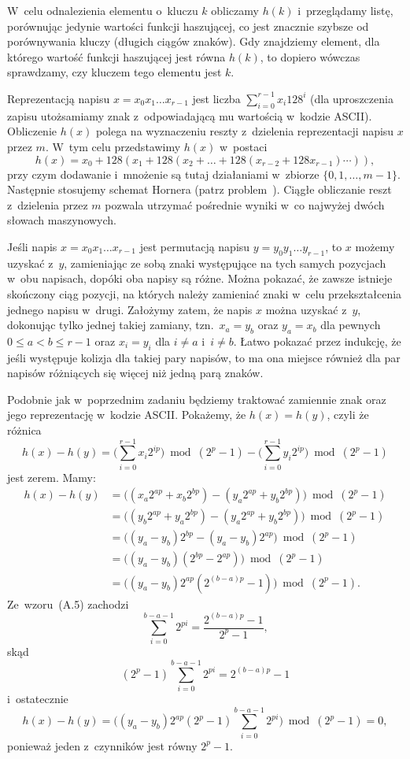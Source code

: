 
\exercise %
W~celu odnalezienia elementu o~kluczu $k$ obliczamy $h(k)$ i~przeglądamy listę, porównując jedynie wartości funkcji haszującej, co jest znacznie szybsze od porównywania kluczy (długich ciągów znaków).
Gdy znajdziemy element, dla którego wartość funkcji haszującej jest równa $h(k)$, to dopiero wówczas sprawdzamy, czy kluczem tego elementu jest $k$.

\exercise %
Reprezentacją napisu $x=x_0x_1\dots x_{r-1}$ jest liczba $\sum_{i=0}^{r-1}x_i128^i$ (dla uproszczenia zapisu utożsamiamy znak z~odpowiadającą mu wartością w~kodzie ASCII).
Obliczenie $h(x)$ polega na wyznaczeniu reszty z~dzielenia reprezentacji napisu $x$ przez $m$.
W~tym celu przedstawimy $h(x)$ w~postaci
\[
	h(x) = x_0+128(x_1+128(x_2+\dots+128(x_{r-2}+128x_{r-1})\cdots)),
\]
przy czym dodawanie i~mnożenie są tutaj działaniami w~zbiorze $\{0,1,\dots,m-1\}$.
Następnie stosujemy schemat Hornera (patrz problem~).
Ciągłe obliczanie reszt z~dzielenia przez $m$ pozwala utrzymać pośrednie wyniki w~co najwyżej dwóch słowach maszynowych.

\exercise %
Jeśli napis $x=x_0x_1\dots x_{r-1}$ jest permutacją napisu $y=y_0y_1\dots y_{r-1}$, to $x$ możemy uzyskać z~$y$, zamieniając ze sobą znaki występujące na tych samych pozycjach w~obu napisach, dopóki oba napisy są różne.
Można pokazać, że zawsze istnieje skończony ciąg pozycji, na których należy zamieniać znaki w~celu przekształcenia jednego napisu w~drugi.
Założymy zatem, że napis $x$ można uzyskać z~$y$, dokonując tylko jednej takiej zamiany, tzn.\ $x_a=y_b$ oraz $y_a=x_b$ dla pewnych $0\le a<b\le r-1$ oraz $x_i=y_i$ dla $i\ne a$ i~$i\ne b$.
Łatwo pokazać przez indukcję, że jeśli występuje kolizja dla takiej pary napisów, to ma ona miejsce również dla par napisów różniących się więcej niż jedną parą znaków.

Podobnie jak w~poprzednim zadaniu będziemy traktować zamiennie znak oraz jego reprezentację w~kodzie ASCII\@.
Pokażemy, że $h(x)=h(y)$, czyli że różnica
\[
	h(x)-h(y) = \biggl(\sum_{i=0}^{r-1}x_i2^{ip}\biggr)\bmod(2^p-1)-\biggl(\sum_{i=0}^{r-1}y_i2^{ip}\biggr)\bmod(2^p-1)
\]
jest zerem.
Mamy:
\begin{align*}
	h(x)-h(y) &= \bigl((x_a2^{ap}+x_b2^{bp})-(y_a2^{ap}+y_b2^{bp})\bigr)\bmod(2^p-1) \\
	&= \bigl((y_b2^{ap}+y_a2^{bp})-(y_a2^{ap}+y_b2^{bp})\bigr)\bmod(2^p-1) \\
	&= \bigl((y_a-y_b)2^{bp}-(y_a-y_b)2^{ap}\bigr)\bmod(2^p-1) \\
	&= \bigl((y_a-y_b)(2^{bp}-2^{ap})\bigr)\bmod(2^p-1) \\
	&= \bigl((y_a-y_b)2^{ap}(2^{(b-a)p}-1)\bigr)\bmod(2^p-1).
\end{align*}
Ze~wzoru~(A.5) zachodzi
\[
	\sum_{i=0}^{b-a-1}2^{pi} = \frac{2^{(b-a)p}-1}{2^p-1},
\]
skąd
\[
	(2^p-1)\sum_{i=0}^{b-a-1}2^{pi} = 2^{(b-a)p}-1
\]
i~ostatecznie
\[
	h(x)-h(y) = \biggl((y_a-y_b)2^{ap}(2^p-1)\sum_{i=0}^{b-a-1}2^{pi}\biggr)\bmod(2^p-1) = 0,
\]
ponieważ jeden z~czynników jest równy $2^p-1$.

